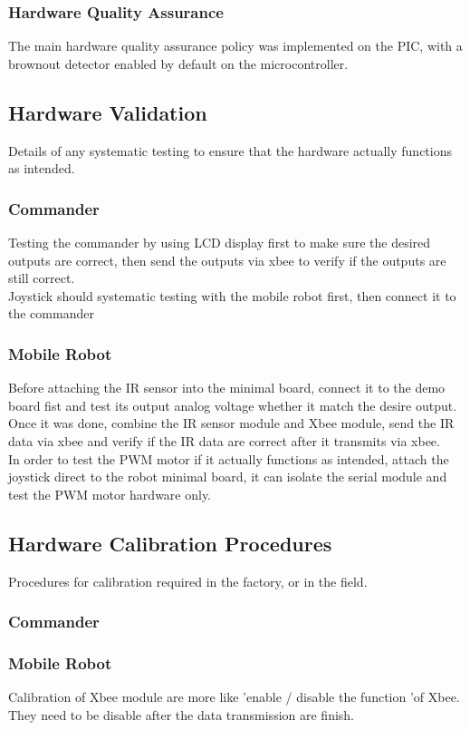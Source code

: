 \documentclass[11pt,a4paper]{article}
\begin{document}
    \subsubsection{Hardware Quality Assurance}
      The main hardware quality assurance policy was implemented on the PIC, with a brownout detector enabled by default on the microcontroller.\\

  \subsection{Hardware Validation}
  Details of any systematic testing to ensure that the hardware actually functions as intended.
    \subsubsection{Commander}
    Testing the commander by using LCD display first to make sure the desired outputs are correct, then send the outputs via xbee to verify if the outputs are still correct. \\
    Joystick should systematic testing with the mobile robot first, then connect it to the commander\\
    \subsubsection{Mobile Robot}
    Before attaching the IR sensor into the minimal board, connect it to the demo board fist and test its output analog  voltage whether it match the desire output. Once it was done, combine the IR sensor module and Xbee module, send the IR data via xbee and verify if the IR data are correct after it transmits via xbee.\\
    In order to test the PWM motor if it actually functions as intended, attach the joystick direct to the robot minimal board, it can isolate the serial module and test the PWM motor hardware only. \\

  \subsection{Hardware Calibration Procedures}
    Procedures for calibration required in the factory, or in the field.
    \subsubsection{Commander}
    \subsubsection{Mobile Robot}
    Calibration of Xbee module are more like 'enable / disable the function 'of Xbee. They need to be disable after the data transmission are finish. 
\end{document}
